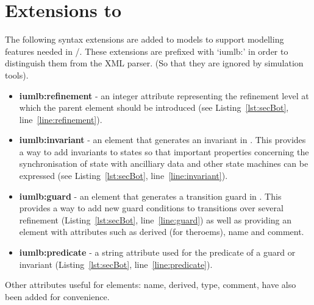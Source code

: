 
\section{Extensions to \SCXML}
\label{sec:extensions}
 
The following syntax extensions are added to \SCXML models to support modelling features needed in \iUMLB/\EventB. These extensions are prefixed with `iumlb:' in order to distinguish them from the \SCXML XML parser. (So that they are ignored by \SCXML simulation tools). 
\begin{itemize}
	\item \textbf{iumlb:refinement} - an integer attribute representing the refinement level at which the parent element should be introduced (see Listing~\ref{lst:secBot}, line~\ref{line:refinement}).
	\item \textbf{iumlb:invariant} - an element that generates an invariant in \iUMLB. This provides a way to add invariants to states so that important properties concerning the synchronisation of state with ancilliary data and other state machines can be expressed (see Listing~\ref{lst:secBot}, line~\ref{line:invariant}).
	\item \textbf{iumlb:guard} - an element that generates a transition guard in \iUMLB. 
	This provides a way to add new guard conditions to transitions over several refinement (Listing~\ref{lst:secBot}, line~\ref{line:guard}) as well as providing an element with attributes such as derived (for \EventB theroems), name and comment.
	\item \textbf{iumlb:predicate} - a string attribute used for the predicate of a guard or invariant (Listing~\ref{lst:secBot}, line~\ref{line:predicate}).
\end{itemize}
Other attributes useful for \iUMLB elements: name, derived, type, comment, have also been added for convenience.


